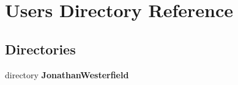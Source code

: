 \section{Users Directory Reference}
\label{dir_d522931ffa1371640980b621734a4381}
\subsection*{Directories}
\begin{DoxyCompactItemize}
\item 
directory {\bf Jonathan\+Westerfield}
\end{DoxyCompactItemize}
